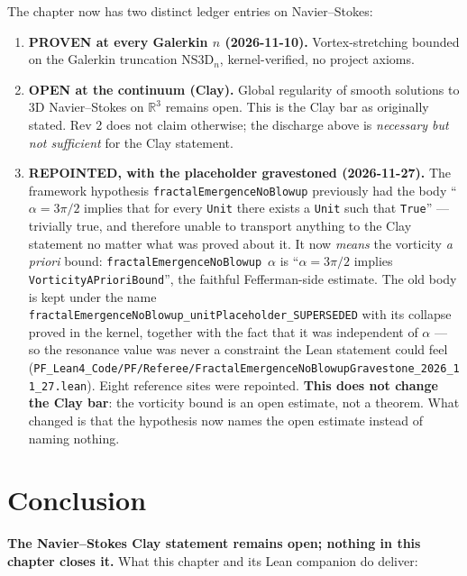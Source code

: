 The chapter now has two distinct ledger entries on Navier--Stokes:
\begin{enumerate}
\item \textbf{PROVEN at every Galerkin $n$ (2026-11-10).}
  Vortex-stretching bounded on the Galerkin truncation $\mathrm{NS3D}_n$,
  kernel-verified, no project axioms.
\item \textbf{OPEN at the continuum (Clay).}  Global regularity of
  smooth solutions to 3D Navier--Stokes on $\mathbb{R}^3$ remains open.
  This is the Clay bar as originally stated.  Rev 2 does not claim
  otherwise; the discharge above is \emph{necessary but not sufficient}
  for the Clay statement.
\item \textbf{REPOINTED, with the placeholder gravestoned (2026-11-27).}
  The framework hypothesis \texttt{fractalEmergenceNoBlowup} previously had the
  body ``$\alpha = 3\pi/2$ implies that for every \texttt{Unit} there exists a
  \texttt{Unit} such that \texttt{True}'' --- trivially true, and therefore
  unable to transport anything to the Clay statement no matter what was proved
  about it. It now \emph{means} the vorticity \emph{a priori} bound:
  \texttt{fractalEmergenceNoBlowup}~$\alpha$ is
  ``$\alpha = 3\pi/2$ implies \texttt{VorticityAPrioriBound}'', the faithful
  Fefferman-side estimate. The old body is kept under the name
  \texttt{fractalEmergenceNoBlowup\_unitPlaceholder\_SUPERSEDED} with its
  collapse proved in the kernel, together with the fact that it was
  independent of $\alpha$ --- so the resonance value was never a constraint the
  Lean statement could feel
  (\texttt{PF\_Lean4\_Code/PF/Referee/FractalEmergenceNoBlowupGravestone\_2026\_11\_27.lean}).
  Eight reference sites were repointed. \textbf{This does not change the Clay
  bar}: the vorticity bound is an open estimate, not a theorem. What changed is
  that the hypothesis now names the open estimate instead of naming nothing.

\end{enumerate}

\section{Conclusion}

\textbf{The Navier--Stokes Clay statement remains open; nothing in this chapter closes it.}  What this chapter and its Lean companion do deliver:

